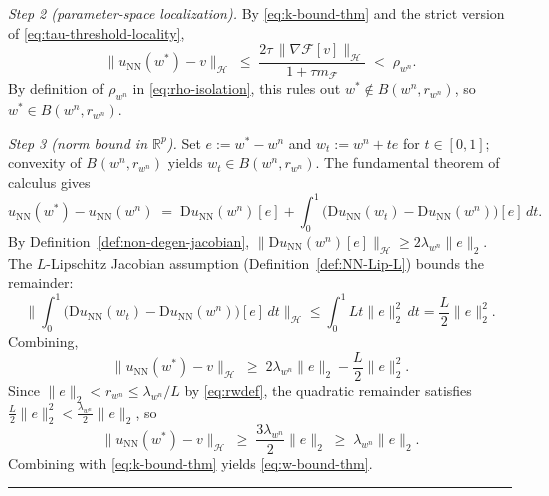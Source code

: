 \documentclass[twoside,11pt]{article}
\newcommand{\BlackBoxProof}{\rule{1.5ex}{1.5ex}}
\renewenvironment{proof}{\par\noindent{\bf Proof\ }}{\hfill\BlackBoxProof\par\medskip}
\newcommand{\R}{\mathbb{R}}
\newcommand{\D}{\mathrm{D}}
\newcommand{\NN}{\mathrm{NN}}
\newcommand{\calF}{\mathcal{F}}
\newcommand{\calH}{\mathcal{H}}
\begin{document}
\begin{proof}
\emph{Step 2 (parameter-space localization).}
By \eqref{eq:k-bound-thm} and the strict version of \eqref{eq:tau-threshold-locality},
\[
\|u_\NN(w^*)-v\|_\calH\;\le\;\frac{2\tau\,\|\nabla\calF[v]\|_\calH}{1+\tau m_\calF}\;<\;\rho_{w^n}.
\]
By definition of $\rho_{w^n}$ in \eqref{eq:rho-isolation}, this rules out $w^*\notin B(w^n,r_{w^n})$, so $w^*\in B(w^n,r_{w^n})$.

\emph{Step 3 (norm bound in $\R^p$).}
Set $e:=w^*-w^n$ and $w_t:=w^n+te$ for $t\in[0,1]$; convexity of $B(w^n,r_{w^n})$ yields $w_t\in B(w^n,r_{w^n})$. The fundamental theorem of calculus gives
\[
u_\NN(w^*)-u_\NN(w^n)
\;=\;\D u_\NN(w^n)[e]+\int_0^1\big(\D u_\NN(w_t)-\D u_\NN(w^n)\big)[e]\,dt.
\]
By Definition~\ref{def:non-degen-jacobian}, $\|\D u_\NN(w^n)[e]\|_\calH\ge 2\lambda_{w^n}\|e\|_2$. The $L$-Lipschitz Jacobian assumption (Definition~\ref{def:NN-Lip-L}) bounds the remainder:
\[
\Big\|\!\int_0^1\!\big(\D u_\NN(w_t)-\D u_\NN(w^n)\big)[e]\,dt\Big\|_\calH
\le\int_0^1\!Lt\|e\|_2^2\,dt=\frac{L}{2}\|e\|_2^2.
\]
Combining,
\[
\|u_\NN(w^*)-v\|_\calH
\;\ge\;2\lambda_{w^n}\|e\|_2-\frac{L}{2}\|e\|_2^2.
\]
Since $\|e\|_2 < r_{w^n}\le \lambda_{w^n}/L$ by \eqref{eq:rwdef}, the quadratic remainder satisfies $\tfrac{L}{2}\|e\|_2^2 < \tfrac{\lambda_{w^n}}{2}\|e\|_2$, so
\[
\|u_\NN(w^*)-v\|_\calH\;\ge\;\frac{3\lambda_{w^n}}{2}\|e\|_2\;\ge\;\lambda_{w^n}\|e\|_2.
\]
Combining with \eqref{eq:k-bound-thm} yields \eqref{eq:w-bound-thm}.
\end{proof}
\end{document}
